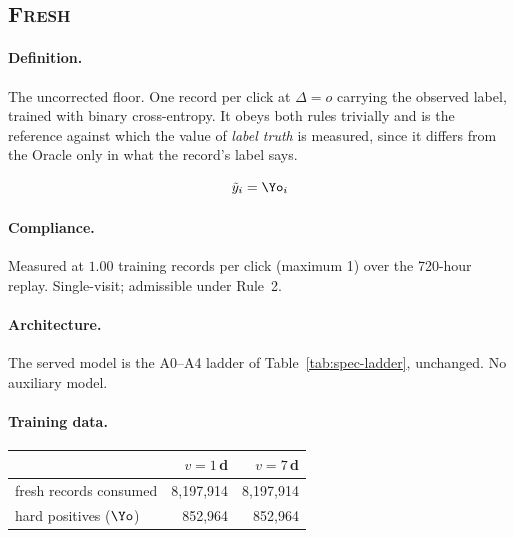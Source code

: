 \subsection{\textsc{Fresh}}\label{app:m-Vanilla-fresh}

\paragraph{Definition.} The uncorrected floor. One record per click at $\Delta=o$ carrying the observed label,
   trained with binary cross-entropy. It obeys both rules trivially and is the reference against
   which the value of \emph{label truth} is measured, since it differs from the Oracle only in
   what the record's label says.

\begin{equation}
\tilde y_i = \Yo_i
\end{equation}

\begin{center}\end{center}

\paragraph{Compliance.} Measured at $1.00$ training records per click (maximum 1) over the 720-hour replay. Single-visit; admissible under Rule~2.

\paragraph{Architecture.} The served model is the A0--A4 ladder of Table~\ref{tab:spec-ladder}, unchanged. No auxiliary model.

\paragraph{Training data.}
\begin{center}\small\begin{tabular}{lrr}
\toprule
 & $v=1$\,d & $v=7$\,d\\
\midrule
fresh records consumed & 8{,}197{,}914 & 8{,}197{,}914\\
hard positives ($\Yo$) & 852{,}964 & 852{,}964\\
\bottomrule
\end{tabular}\end{center}

